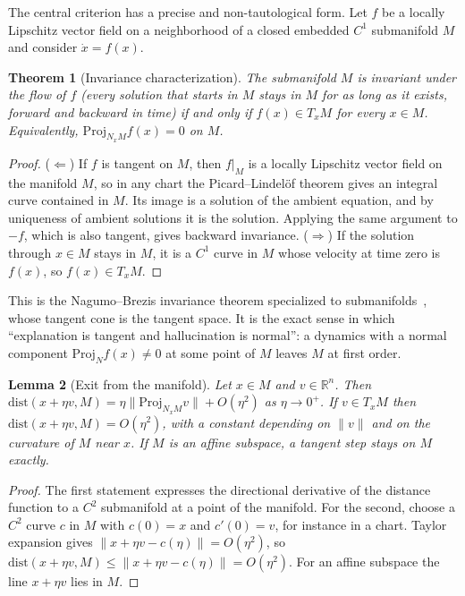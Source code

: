 \documentclass[11pt,a4paper]{article}
\newtheorem{theorem}{Theorem}[section]
\newtheorem{lemma}[theorem]{Lemma}
\theoremstyle{definition}
\theoremstyle{remark}
\newcommand{\R}{\mathbb{R}}
\newcommand{\Proj}{\mathrm{Proj}}
\newcommand{\TM}[1]{T_{#1}M}
\newcommand{\NM}[1]{N_{#1}M}
\newcommand{\dist}{\mathrm{dist}}
\begin{document}
The central criterion has a precise and non-tautological form. Let
$f$ be a locally Lipschitz vector field on a neighborhood of a closed
embedded $C^1$ submanifold $M$ and consider $\dot x=f(x)$.

\begin{theorem}[Invariance characterization]\label{thm:invariance}
The submanifold $M$ is invariant under the flow of $f$ (every solution
that starts in $M$ stays in $M$ for as long as it exists, forward and
backward in time) if and only if $f(x)\in\TM{x}$ for every $x\in M$.
Equivalently, $\Proj_{\NM{x}}f(x)=0$ on $M$.
\end{theorem}

\begin{proof}
($\Leftarrow$) If $f$ is tangent on $M$, then $f|_M$ is a locally
Lipschitz vector field on the manifold $M$, so in any chart the
Picard--Lindel\"of theorem gives an integral curve contained in $M$. Its
image is a solution of the ambient equation, and by uniqueness of
ambient solutions it is the solution. Applying the same argument to $-f$,
which is also tangent, gives backward invariance. ($\Rightarrow$) If the
solution through $x\in M$ stays in $M$, it is a $C^1$ curve in $M$ whose
velocity at time zero is $f(x)$, so $f(x)\in\TM{x}$.
\end{proof}

This is the Nagumo--Brezis invariance theorem specialized to
submanifolds~\cite{nagumo1942lage,brezis1970characterization}, whose
tangent cone is the tangent space. It is the exact sense in which
``explanation is tangent and hallucination is normal'': a dynamics with a
normal component $\Proj_N f(x)\ne0$ at some point of $M$ leaves $M$ at
first order.

\begin{lemma}[Exit from the manifold]\label{lem:exit}
Let $x\in M$ and $v\in\R^n$. Then $\dist(x+\eta v,M)=\eta\|\Proj_{\NM{x}}v\|+O(\eta^2)$
as $\eta\to0^+$. If $v\in\TM{x}$ then $\dist(x+\eta v,M)=O(\eta^2)$, with a
constant depending on $\|v\|$ and on the curvature of $M$ near $x$. If $M$ is
an affine subspace, a tangent step stays on $M$ exactly.
\end{lemma}

\begin{proof}
The first statement expresses the directional derivative of the distance
function to a $C^2$ submanifold at a point of the manifold. For the second,
choose a $C^2$ curve $c$ in $M$ with $c(0)=x$ and $c'(0)=v$, for instance in
a chart. Taylor expansion gives $\|x+\eta v-c(\eta)\|=O(\eta^2)$, so
$\dist(x+\eta v,M)\le\|x+\eta v-c(\eta)\|=O(\eta^2)$. For an affine subspace
the line $x+\eta v$ lies in $M$.
\end{proof}
\end{document}

